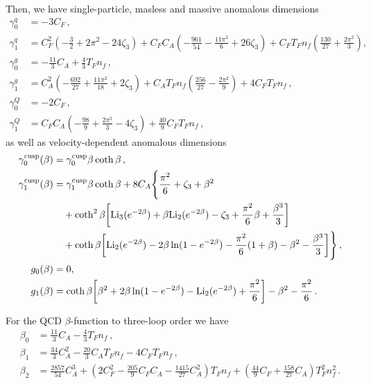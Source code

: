 \documentclass[a4paper,11pt]{article}
\numberwithin{equation}{section}
\begin{document}
Then, we have single-particle, masless and massive anomalous
dimensions~\cite{Becher:2009qa, Becher:2009kw}
%
\begin{align}
  \gamma^q_0 &= - 3 C_F \, ,
  \nonumber
  \\
  \gamma^q_1 &= C_F^2 \left( -\frac{3}{2} + 2 \pi^2 - 24 \zeta_3 \right) + C_F C_A \left(
    - \frac{961}{54} - \frac{11\pi^2}{6} + 26 \zeta_3 \right) 
    + C_F T_F n_f \left( \frac{130}{27} + \frac{2\pi^2}{3} \right) ,
  \nonumber
  \\
  \gamma^g_0 &= - \frac{11}{3} C_A + \frac{4}{3} T_F n_f \, ,
  \nonumber
  \\
  \gamma^g_1 &= C_A^2 \left( - \frac{692}{27} + \frac{11\pi^2}{18} + 2 \zeta_3 \right) +
  C_A T_F n_f \left( \frac{256}{27} - \frac{2\pi^2}{9} \right) + 4 C_F T_F n_f \, ,
  \nonumber
  \\
  \gamma^Q_0 &= - 2 C_F \, ,
  \nonumber
  \\
  \gamma^Q_1 &= C_F C_A \left( -\frac{98}{9} + \frac{2\pi^2}{3} - 4 \zeta_3 \right) +
  \frac{40}{9} C_F T_F n_f \, ,
\end{align}
%
as well as velocity-dependent anomalous dimensions~\cite{Becher:2009kw,
Ferroglia:2009ep, Ferroglia:2009ii, Korchemsky:1987wg, Korchemsky:1991zp,
Kidonakis:2009ev}
%
\begin{align}
  \gamma^{\text{cusp}}_0(\beta) &= \gamma^{\text{cusp}}_0 \beta \coth \beta
  \, ,
  \nonumber
  \\
  \gamma^{\text{cusp}}_1(\beta) &= \gamma^{\text{cusp}}_1 \beta \coth \beta
  + 8 C_A \Bigg\{ \frac{\pi^2}{6} + \zeta_3 + \beta^2 \nonumber
  \\
  &\quad + \coth^2\beta \bigg[ \mathrm{Li}_3(e^{-2\beta}) + \beta
  \mathrm{Li}_2(e^{-2\beta}) - \zeta_3 + \frac{\pi^2}{6} \beta + \frac{\beta^3}{3}
  \bigg]
  \nonumber
  \\
  &\quad + \coth\beta \bigg[ \mathrm{Li}_2(e^{-2\beta}) - 2\beta
  \ln(1-e^{-2\beta}) - \frac{\pi^2}{6} (1+\beta) - \beta^2 -
  \frac{\beta^3}{3} \bigg] \Bigg\} \, , \nonumber
  \\ 
  g_0(\beta)&=0, \nonumber \\
  g_1(\beta) &= \coth\beta \bigg[ \beta^2 + 2\beta
  \ln(1-e^{-2\beta}) - \mathrm{Li}_2(e^{-2\beta}) + \frac{\pi^2}{6} \bigg] -
  \beta^2 - \frac{\pi^2}{6} \, .
\end{align}

For the QCD $\beta$-function to three-loop order we have
%
\begin{align}
  \beta_0 &= \frac{11}{3} C_A - \frac{4}{3} T_F n_f \, ,
  \nonumber\\
  \beta_1 &= \frac{34}{3} C_A^2 - \frac{20}{3} C_A T_F n_f - 4 C_F T_F n_f \, ,
  \nonumber\\
  \beta_2 &= \frac{2857}{54} C_A^3 + \left( 2 C_F^2 - \frac{205}{9} C_F C_A -
    \frac{1415}{27} C_A^2 \right) T_F n_f + \left( \frac{44}{9} C_F + \frac{158}{27} C_A
  \right) T_F^2 n_f^2 \, .
\end{align}
\end{document}
